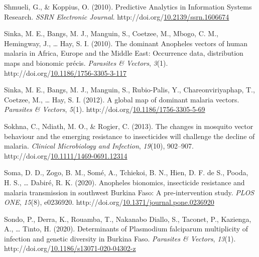 \documentclass[12pt,twoside]{reedthesis}
\newlength{\cslhangindent}
\newenvironment{CSLReferences}[2] %
 {%
  \setlength{\parindent}{0pt}
  \ifodd #1 \everypar{\setlength{\hangindent}{\cslhangindent}}\ignorespaces\fi
  \ifnum #2 > 0
  \setlength{\parskip}{#2\baselineskip}
  \fi
 }%
 {}
\begin{document}
\begin{CSLReferences}{1}{0}
\leavevmode{}%
Shmueli, G., \& Koppius, O. (2010). Predictive {Analytics} in {Information} {Systems} {Research}. \emph{SSRN Electronic Journal}. http://doi.org/\href{https://doi.org/10.2139/ssrn.1606674}{10.2139/ssrn.1606674}

\leavevmode{}%
Sinka, M. E., Bangs, M. J., Manguin, S., Coetzee, M., Mbogo, C. M., Hemingway, J., \ldots{} Hay, S. I. (2010). The dominant {Anopheles} vectors of human malaria in {Africa}, {Europe} and the {Middle} {East}: Occurrence data, distribution maps and bionomic précis. \emph{Parasites \& Vectors}, \emph{3}(1). http://doi.org/\href{https://doi.org/10.1186/1756-3305-3-117}{10.1186/1756-3305-3-117}

\leavevmode{}%
Sinka, M. E., Bangs, M. J., Manguin, S., Rubio-Palis, Y., Chareonviriyaphap, T., Coetzee, M., \ldots{} Hay, S. I. (2012). A global map of dominant malaria vectors. \emph{Parasites \& Vectors}, \emph{5}(1). http://doi.org/\href{https://doi.org/10.1186/1756-3305-5-69}{10.1186/1756-3305-5-69}

\leavevmode{}%
Sokhna, C., Ndiath, M. O., \& Rogier, C. (2013). The changes in mosquito vector behaviour and the emerging resistance to insecticides will challenge the decline of malaria. \emph{Clinical Microbiology and Infection}, \emph{19}(10), 902--907. http://doi.org/\href{https://doi.org/10.1111/1469-0691.12314}{10.1111/1469-0691.12314}

\leavevmode{}%
Soma, D. D., Zogo, B. M., Somé, A., Tchiekoi, B. N., Hien, D. F. de S., Pooda, H. S., \ldots{} Dabiré, R. K. (2020). Anopheles bionomics, insecticide resistance and malaria transmission in southwest {Burkina} {Faso}: {A} pre-intervention study. \emph{PLOS ONE}, \emph{15}(8), e0236920. http://doi.org/\href{https://doi.org/10.1371/journal.pone.0236920}{10.1371/journal.pone.0236920}

\leavevmode{}%
Sondo, P., Derra, K., Rouamba, T., Nakanabo Diallo, S., Taconet, P., Kazienga, A., \ldots{} Tinto, H. (2020). Determinants of {Plasmodium} falciparum multiplicity of infection and genetic diversity in {Burkina} {Faso}. \emph{Parasites \& Vectors}, \emph{13}(1). http://doi.org/\href{https://doi.org/10.1186/s13071-020-04302-z}{10.1186/s13071-020-04302-z}


\end{CSLReferences}
\end{document}
